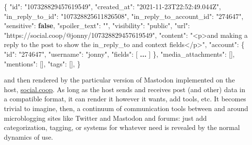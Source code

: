 \documentclass[10pt]{tufte-book}
\newenvironment{Shaded}{}{}
\newcommand{\DataTypeTok}[1]{\textcolor[rgb]{0.56,0.13,0.00}{#1}}
\newcommand{\ErrorTok}[1]{\textcolor[rgb]{1.00,0.00,0.00}{\textbf{#1}}}
\newcommand{\FunctionTok}[1]{\textcolor[rgb]{0.02,0.16,0.49}{#1}}
\newcommand{\KeywordTok}[1]{\textcolor[rgb]{0.00,0.44,0.13}{\textbf{#1}}}
\newcommand{\OtherTok}[1]{\textcolor[rgb]{0.00,0.44,0.13}{#1}}
\newcommand{\StringTok}[1]{\textcolor[rgb]{0.25,0.44,0.63}{#1}}
\begin{document}
\begin{Shaded}
\begin{Highlighting}[]
\FunctionTok{\{}
    \DataTypeTok{"id"}\FunctionTok{:} \StringTok{"107328829457619549"}\FunctionTok{,}
    \DataTypeTok{"created\_at"}\FunctionTok{:} \StringTok{"2021{-}11{-}23T22:52:49.044Z"}\FunctionTok{,}
    \DataTypeTok{"in\_reply\_to\_id"}\FunctionTok{:} \StringTok{"107328825611826508"}\FunctionTok{,}
    \DataTypeTok{"in\_reply\_to\_account\_id"}\FunctionTok{:} \StringTok{"274647"}\FunctionTok{,}
    \DataTypeTok{"sensitive"}\FunctionTok{:} \KeywordTok{false}\FunctionTok{,}
    \DataTypeTok{"spoiler\_text"}\FunctionTok{:} \StringTok{""}\FunctionTok{,}
    \DataTypeTok{"visibility"}\FunctionTok{:} \StringTok{"public"}\FunctionTok{,}
    \DataTypeTok{"url"}\FunctionTok{:} \StringTok{"https://social.coop/@jonny/107328829457619549"}\FunctionTok{,}
    \DataTypeTok{"content"}\FunctionTok{:} \StringTok{"\textless{}p\textgreater{}and making a reply to the post to show the in\_reply\_to and context fields\textless{}/p\textgreater{}"}\FunctionTok{,}
    \DataTypeTok{"account"}\FunctionTok{:}
    \FunctionTok{\{}
        \DataTypeTok{"id"}\FunctionTok{:} \StringTok{"274647"}\FunctionTok{,}
        \DataTypeTok{"username"}\FunctionTok{:} \StringTok{"jonny"}\FunctionTok{,}
        \DataTypeTok{"fields"}\FunctionTok{:}
        \OtherTok{[} \ErrorTok{...} \OtherTok{]}
    \FunctionTok{\},}
    \DataTypeTok{"media\_attachments"}\FunctionTok{:} \OtherTok{[]}\FunctionTok{,}
    \DataTypeTok{"mentions"}\FunctionTok{:} \OtherTok{[]}\FunctionTok{,}
    \DataTypeTok{"tags"}\FunctionTok{:} \OtherTok{[]}\FunctionTok{,}
\FunctionTok{\}}
\end{Highlighting}
\end{Shaded}

and then rendered by the particular version of Mastodon implemented on
the host, \href{https://social.coop}{social.coop}. As long as the host
sends and receives post (and other) data in a compatible format, it can
render it however it wants, add tools, etc. It becomes trivial to
imagine, then, a continuum of communication tools between and around
microblogging sites like Twitter and Mastodon and forums: just add
categorization, tagging, or systems for whatever need is revealed by the
normal dynamics of use.
\end{document}
